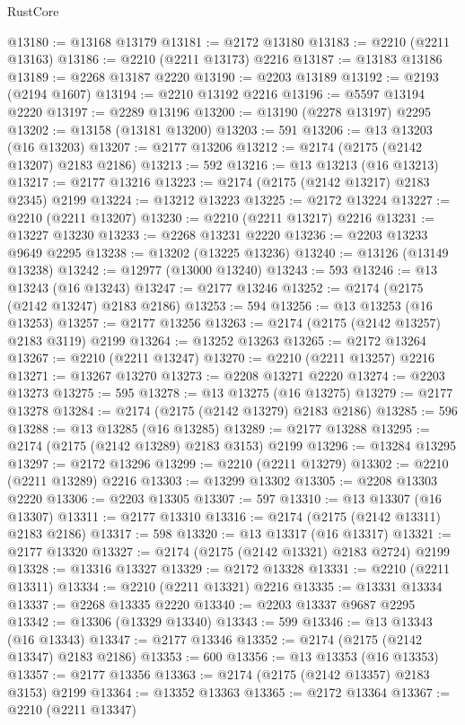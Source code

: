 \begin{lexlean}{RustCore}
\begin{coremodule}
@13180 := @13168 @13179
@13181 := @2172 @13180
@13183 := @2210 (@2211 @13163)
@13186 := @2210 (@2211 @13173) @2216
@13187 := @13183 @13186
@13189 := @2268 @13187 @2220
@13190 := @2203 @13189
@13192 := @2193 (@2194 @1607)
@13194 := @2210 @13192 @2216
@13196 := @5597 @13194 @2220
@13197 := @2289 @13196
@13200 := @13190 (@2278 @13197) @2295
@13202 := @13158 (@13181 @13200)
@13203 := 591
@13206 := @13 @13203 (@16 @13203)
@13207 := @2177 @13206
@13212 := @2174 (@2175 (@2142 @13207) @2183 @2186)
@13213 := 592
@13216 := @13 @13213 (@16 @13213)
@13217 := @2177 @13216
@13223 := @2174 (@2175 (@2142 @13217) @2183 @2345) @2199
@13224 := @13212 @13223
@13225 := @2172 @13224
@13227 := @2210 (@2211 @13207)
@13230 := @2210 (@2211 @13217) @2216
@13231 := @13227 @13230
@13233 := @2268 @13231 @2220
@13236 := @2203 @13233 @9649 @2295
@13238 := @13202 (@13225 @13236)
@13240 := @13126 (@13149 @13238)
@13242 := @12977 (@13000 @13240)
@13243 := 593
@13246 := @13 @13243 (@16 @13243)
@13247 := @2177 @13246
@13252 := @2174 (@2175 (@2142 @13247) @2183 @2186)
@13253 := 594
@13256 := @13 @13253 (@16 @13253)
@13257 := @2177 @13256
@13263 := @2174 (@2175 (@2142 @13257) @2183 @3119) @2199
@13264 := @13252 @13263
@13265 := @2172 @13264
@13267 := @2210 (@2211 @13247)
@13270 := @2210 (@2211 @13257) @2216
@13271 := @13267 @13270
@13273 := @2208 @13271 @2220
@13274 := @2203 @13273
@13275 := 595
@13278 := @13 @13275 (@16 @13275)
@13279 := @2177 @13278
@13284 := @2174 (@2175 (@2142 @13279) @2183 @2186)
@13285 := 596
@13288 := @13 @13285 (@16 @13285)
@13289 := @2177 @13288
@13295 := @2174 (@2175 (@2142 @13289) @2183 @3153) @2199
@13296 := @13284 @13295
@13297 := @2172 @13296
@13299 := @2210 (@2211 @13279)
@13302 := @2210 (@2211 @13289) @2216
@13303 := @13299 @13302
@13305 := @2208 @13303 @2220
@13306 := @2203 @13305
@13307 := 597
@13310 := @13 @13307 (@16 @13307)
@13311 := @2177 @13310
@13316 := @2174 (@2175 (@2142 @13311) @2183 @2186)
@13317 := 598
@13320 := @13 @13317 (@16 @13317)
@13321 := @2177 @13320
@13327 := @2174 (@2175 (@2142 @13321) @2183 @2724) @2199
@13328 := @13316 @13327
@13329 := @2172 @13328
@13331 := @2210 (@2211 @13311)
@13334 := @2210 (@2211 @13321) @2216
@13335 := @13331 @13334
@13337 := @2268 @13335 @2220
@13340 := @2203 @13337 @9687 @2295
@13342 := @13306 (@13329 @13340)
@13343 := 599
@13346 := @13 @13343 (@16 @13343)
@13347 := @2177 @13346
@13352 := @2174 (@2175 (@2142 @13347) @2183 @2186)
@13353 := 600
@13356 := @13 @13353 (@16 @13353)
@13357 := @2177 @13356
@13363 := @2174 (@2175 (@2142 @13357) @2183 @3153) @2199
@13364 := @13352 @13363
@13365 := @2172 @13364
@13367 := @2210 (@2211 @13347)

\end{coremodule}
\end{lexlean}
